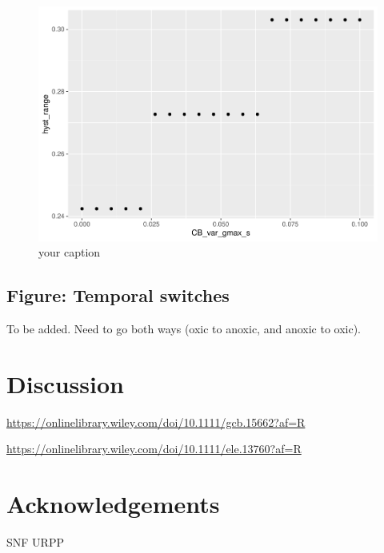 \documentclass{article}
\begin{document}
\begin{figure}

{\centering \includegraphics[width=1\linewidth]{article_files/figure-latex/ss_var3-1} 

}

\caption{your caption}\label{fig:ss_var3}
\end{figure}

\hypertarget{figure-temporal-switches}{%
\subsection{Figure: Temporal switches}\label{figure-temporal-switches}}

To be added. Need to go both ways (oxic to anoxic, and anoxic to oxic).

\hypertarget{discussion}{%
\section{Discussion}\label{discussion}}

\url{https://onlinelibrary.wiley.com/doi/10.1111/gcb.15662?af=R}

\url{https://onlinelibrary.wiley.com/doi/10.1111/ele.13760?af=R}

\hypertarget{acknowledgements}{%
\section{Acknowledgements}\label{acknowledgements}}

SNF URPP
\end{document}
